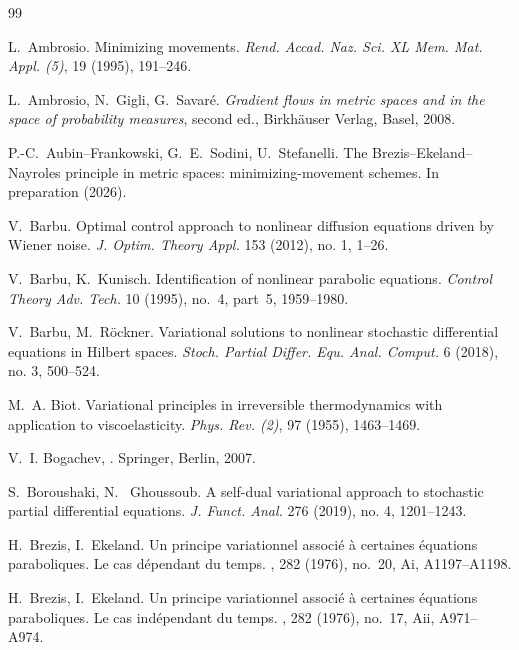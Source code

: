 \documentclass[reqno]{amsart}
\begin{document}

\begin{thebibliography}{99}

 L.~Ambrosio. Minimizing movements. {\it Rend. Accad. Naz. Sci. XL Mem. Mat. Appl. (5)}, 19 (1995), 191--246.

 L.~Ambrosio, N.~Gigli, G.~Savar{\'e}. \emph{Gradient flows in
   metric spaces and in the space of probability measures}, second ed., 
 	Birkh\"auser Verlag, Basel, 2008.
   
P.-C.~Aubin--Frankowski, G.~E.~Sodini, U.~Stefanelli. The
Brezis--Ekeland--Nayroles principle in metric spaces:
minimizing-movement schemes. In preparation (2026).
 
V.~Barbu. Optimal control approach to nonlinear diffusion equations
driven by Wiener noise. {\it J. Optim. Theory Appl.} 153 (2012),
no. 1, 1--26.

 V.~Barbu, K.~Kunisch.  Identification of nonlinear parabolic
  equations. {\it Control Theory Adv. Tech.} 10 (1995), no.~4, part~5, 1959--1980.

V.~Barbu, M.~R\"ockner. Variational solutions to nonlinear stochastic
differential equations in Hilbert spaces. {\it Stoch. Partial
  Differ. Equ. Anal. Comput.} 6 (2018), no. 3, 500--524.

M.~A. Biot. {Variational principles in irreversible thermodynamics
  with application to viscoelasticity}. {\it Phys. Rev. (2)}, 97
(1955), 1463--1469.

V.~I. Bogachev, 
.
\newblock Springer, Berlin, 2007.

 S.~Boroushaki, N.~ Ghoussoub. A self-dual variational approach to
 stochastic partial differential equations. {\it J. Funct. Anal.} 276
 (2019), no. 4, 1201--1243.

H.~Brezis, I.~Ekeland.
\newblock Un principe variationnel associ\'e \`a certaines \'equations
  paraboliques. {L}e cas d\'ependant du temps.
, 282 (1976), 
no.~20, Ai,  A1197--A1198.

H.~Brezis, I.~Ekeland.
\newblock Un principe variationnel associ\'e \`a certaines \'equations
  paraboliques. {L}e cas ind\'ependant du temps.
, 282 (1976),  
no.~17, Aii,  A971--A974.


\end{thebibliography}
\end{document}
